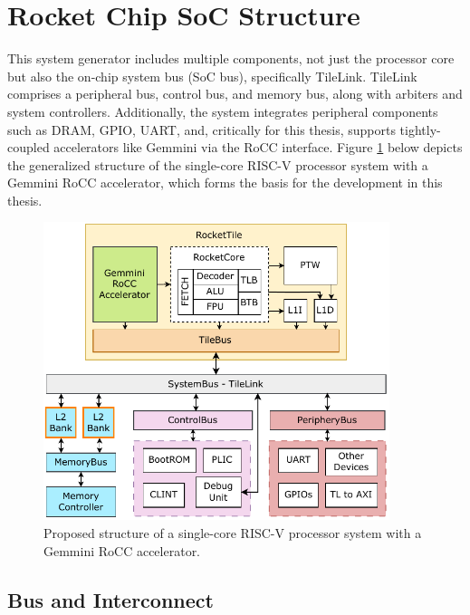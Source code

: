 \section{Rocket Chip SoC Structure}
\label{sec:rocketchip_soc_structure}

This system generator includes multiple components, not just the processor core but also the on-chip system bus (SoC bus), specifically TileLink. TileLink comprises a peripheral bus, control bus, and memory bus, along with arbiters and system controllers. Additionally, the system integrates peripheral components such as DRAM, GPIO, UART, and, critically for this thesis, supports tightly-coupled accelerators like Gemmini via the RoCC interface. Figure \ref{fig:single_core_gemmini_system} below depicts the generalized structure of the single-core RISC-V processor system with a Gemmini RoCC accelerator, which forms the basis for the development in this thesis.

\begin{figure}[h!]
    \centering
    \includegraphics[width=0.9\textwidth]{Images/RocketChip_Gemmini_Diagram.pdf}
    \caption{Proposed structure of a single-core RISC-V processor system with a Gemmini RoCC accelerator.}
    \label{fig:single_core_gemmini_system}
\end{figure}

\subsection{Bus and Interconnect}
\label{subsec:bus_interconnect}

